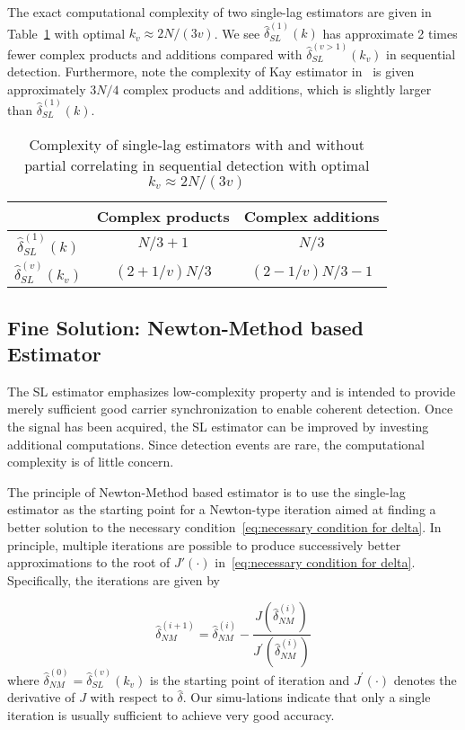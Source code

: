 The exact computational complexity of two single-lag estimators are given in Table~\ref{table:computational complexity comparison} with optimal $k_v \approx 2N/(3v)$. 
We see $\hat{\delta}_{SL}^{(1)}(k)$ has approximate 2 times fewer complex products and additions compared with $\hat{\delta}_{SL}^{(v>1)}(k_v)$ in sequential detection.
Furthermore, note the complexity of Kay estimator in~\cite{Morelli_Mengali_98} is given approximately $3N/4$ complex products and additions, 
which is slightly larger than $\hat{\delta}_{SL}^{(1)}(k)$.

\begin{table}[t]
  \caption{Complexity of single-lag estimators with and without partial correlating in sequential detection with optimal $k_v\approx2N/(3v)$}  %
  \centering 
  \begin{tabular}{c c c} 
  \hline\hline 
   & Complex products & Complex additions \\ [0.5ex] 
  \hline 
  $\hat{\delta}_{SL}^{(1)}(k)$  & $N/3+1$ & $N/3$ \\ 
  $\hat{\delta}_{SL}^{(v)}(k_v)$ & $(2+1/v) N/3$ & $(2-1/v)N/3-1$ \\ [1ex]
  \hline
  \end{tabular}
  \label{table:computational complexity comparison}
\end{table}

\subsection{Fine Solution: Newton-Method based Estimator}

The SL estimator emphasizes low-complexity property and is intended
to provide merely sufficient good carrier synchronization to enable coherent detection.
Once the signal has been acquired, the SL estimator can be improved by 
investing additional computations. Since detection events are rare, the computational
complexity is of little concern.

The principle of Newton-Method based estimator is to use the single-lag estimator as the starting point for a Newton-type iteration 
aimed at finding a better solution to the necessary condition~\eqref{eq:necessary condition for delta}. 
In principle, multiple iterations are possible to produce successively better approximations to the root of
$J'(\cdot)$ in~\eqref{eq:necessary condition for delta}. Specifically, the iterations are given by

\begin{equation}
  \label{eq:iter_NM_est}
  \hat{\delta}_{NM}^{(i+1)}=\hat{\delta}_{NM}^{(i)}-
  \frac{J(\hat{\delta}_{NM}^{(i)})}{J^\prime(\hat{\delta}_{NM}^{(i)})}
\end{equation}
where $\hat{\delta}_{NM}^{(0)}=\hat{\delta}^{(v)}_{SL}(k_v)$ is the starting point of iteration and
$J^\prime(\cdot)$ denotes the derivative of $J$ with respect to $\hat{\delta}$. 
Our simu-lations indicate that only a single iteration is usually sufficient to achieve very good accuracy.

